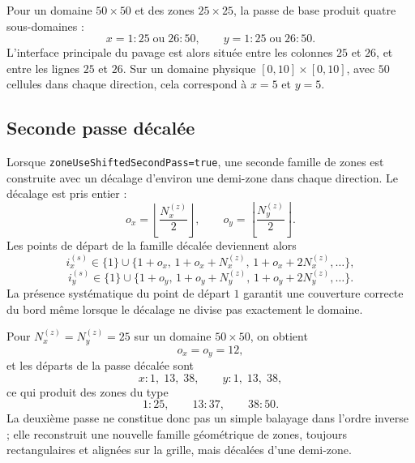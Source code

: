 \documentclass[11pt,a4paper]{article}
\begin{document}
Pour un domaine $50\times 50$ et des zones $25\times 25$, la passe de base produit quatre sous-domaines :
\begin{equation}
 x = 1{:}25 \;\text{ou}\; 26{:}50,
 \qquad
 y = 1{:}25 \;\text{ou}\; 26{:}50.
\end{equation}
L'interface principale du pavage est alors située entre les colonnes $25$ et $26$, et entre les lignes $25$ et $26$. Sur un domaine physique $[0,10]\times[0,10]$, avec $50$ cellules dans chaque direction, cela correspond à $x=5$ et $y=5$.

\subsection{Seconde passe décalée}

Lorsque \verb|zoneUseShiftedSecondPass=true|, une seconde famille de zones est construite avec un décalage d'environ une demi-zone dans chaque direction. Le décalage est pris entier :
\begin{equation}
 o_x = \left\lfloor \frac{N_x^{(z)}}{2} \right\rfloor,
 \qquad
 o_y = \left\lfloor \frac{N_y^{(z)}}{2} \right\rfloor.
\end{equation}
Les points de départ de la famille décalée deviennent alors
\begin{equation}
 i_x^{(s)} \in \{1\} \cup \{1+o_x,\,1+o_x+N_x^{(z)},\,1+o_x+2N_x^{(z)},\dots\},
\end{equation}
\begin{equation}
 i_y^{(s)} \in \{1\} \cup \{1+o_y,\,1+o_y+N_y^{(z)},\,1+o_y+2N_y^{(z)},\dots\}.
\end{equation}
La présence systématique du point de départ $1$ garantit une couverture correcte du bord même lorsque le décalage ne divise pas exactement le domaine.

Pour $N_x^{(z)}=N_y^{(z)}=25$ sur un domaine $50\times 50$, on obtient
\begin{equation}
 o_x=o_y=12,
\end{equation}
et les départs de la passe décalée sont
\begin{equation}
 x : 1,\;13,\;38,
 \qquad
 y : 1,\;13,\;38,
\end{equation}
ce qui produit des zones du type
\begin{equation}
1{:}25,
\qquad
13{:}37,
\qquad
38{:}50.
\end{equation}
La deuxième passe ne constitue donc pas un simple balayage dans l'ordre inverse ; elle reconstruit une nouvelle famille géométrique de zones, toujours rectangulaires et alignées sur la grille, mais décalées d'une demi-zone.
\end{document}
